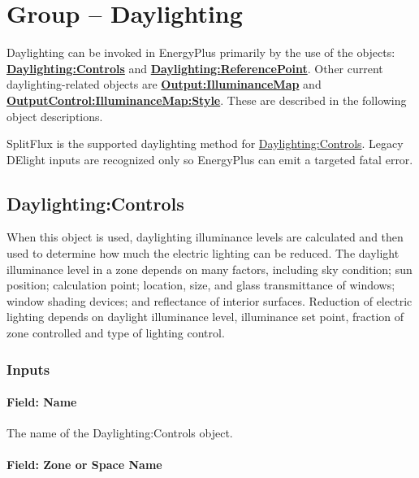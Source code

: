 \section{Group -- Daylighting}\label{group-daylighting}

Daylighting can be invoked in EnergyPlus primarily by the use of the objects: \textbf{\hyperref[daylightingcontrols-000]{Daylighting:Controls}} and \textbf{\hyperref[daylightingreferencepoint-000]{Daylighting:ReferencePoint}}. Other current daylighting-related objects are \textbf{\hyperref[outputilluminancemap]{Output:IlluminanceMap}} and \textbf{\hyperref[outputcontrolilluminancemapstyle]{OutputControl:IlluminanceMap:Style}}. These are described in the following object descriptions.

\begin{callout}
  SplitFlux is the supported daylighting method for \hyperref[daylightingcontrols-000]{Daylighting:Controls}. Legacy DElight inputs are recognized only so EnergyPlus can emit a targeted fatal error.
\end{callout}

\subsection{Daylighting:Controls}\label{daylightingcontrols-000}

When this object is used, daylighting illuminance levels are calculated and then used to determine how much the electric lighting can be reduced. The daylight illuminance level in a zone depends on many factors, including sky condition; sun position; calculation point; location, size, and glass transmittance of windows; window shading devices; and reflectance of interior surfaces. Reduction of electric lighting depends on daylight illuminance level, illuminance set point, fraction of zone controlled and type of lighting control.

\subsubsection{Inputs}\label{inputs-009}

\paragraph{Field: Name}\label{field-name-001}

The name of the Daylighting:Controls object.

\paragraph{Field: Zone or Space Name}\label{daylightingcontrols-field-zone-name}

